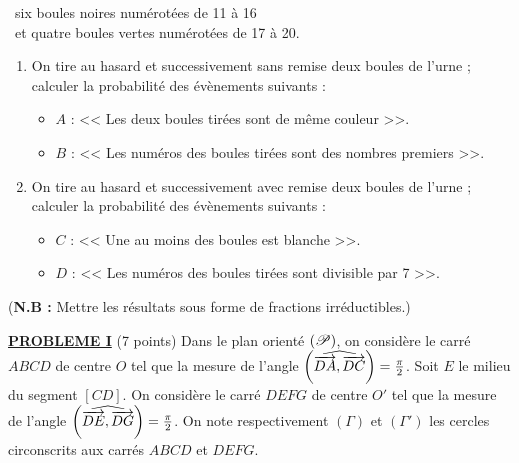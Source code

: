 \begin{description}
\begin{mitanisa}
                        \textbullet\ six boules noires num\'erot\'ees de 11 \`a 16              \\
                        \textbullet\ et quatre boules vertes num\'erot\'ees de 17 \`a 20.
                  \end{mitanisa}
                  \begin{enumerate}
                        \item On tire au hasard et successivement sans remise deux boules de l'urne ;
                              calculer la probabilit\'e des \'ev\`enements suivants :
                              \begin{itemize}
                                    \item $A$ : << Les deux boules tir\'ees sont de m\^eme couleur >>.
                                    \item $B$ : << Les num\'eros des boules tir\'ees sont des nombres premiers >>.
                              \end{itemize}
                        \item On tire au hasard et successivement avec remise deux boules de l'urne ;
                              calculer la probabilit\'e des \'ev\`enements suivants :
                              \begin{itemize}
                                    \item $C$ : << Une au moins des boules est blanche >>.
                                    \item $D$ : << Les num\'eros des boules tir\'ees sont divisible par 7 >>.
                              \end{itemize}
                  \end{enumerate}
                  \begin{center}
                        (\textbf{N.B :} Mettre les r\'esultats sous forme de fractions irr\'eductibles.)
                  \end{center}
      \end{description}
\noindent \underline{\textsc{\textbf{PROBLEME I}}} (7 points) \newline
      Dans le plan orient\'e $(\mathscr{P})$, on consid\`ere le carr\'e $ABCD$ de centre $O$ tel que 
      la mesure de l'angle $\left( \widehat{ \overrightarrow{DA} , \overrightarrow{DC} } \right) = \frac{\pi}{2}$.
      Soit $E$ le milieu du segment $[CD]$.
      On consid\`ere le carr\'e $DEFG$ de centre $O'$ tel que la mesure de l'angle $\left( \widehat{ \overrightarrow{DE} , \overrightarrow{DG} } \right) = \frac{\pi}{2}$.
      On note respectivement $(\Gamma)$ et $(\Gamma ')$ les cercles circonscrits aux carr\'es $ABCD$ et $DEFG$.
      
